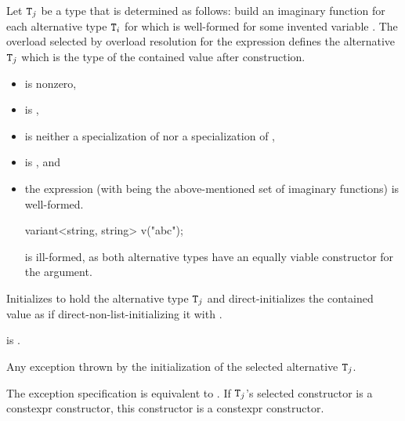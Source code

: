 \begin{itemdescr}
\pnum
Let $\texttt{T}_j$ be a type that is determined as follows:
build an imaginary function 
for each alternative type $\texttt{T}_i$
for which  
is well-formed for some invented variable .
The overload  selected by overload
resolution for the expression  defines
the alternative $\texttt{T}_j$ which is the type of the contained value after
construction.

\pnum
\constraints
\begin{itemize}
\item
{} is nonzero,

\item
{} is ,

\item
{} is neither
a specialization of  nor
a specialization of ,

\item
{} is , and

\item
the expression \brk{}
(with  being the above-mentioned set of
imaginary functions) is well-formed.
\begin{note}
\begin{codeblock}
variant<string, string> v("abc");
\end{codeblock}
is ill-formed, as both alternative types have an equally viable constructor
for the argument.
\end{note}
\end{itemize}

\pnum
\effects
Initializes  to hold the alternative type $\texttt{T}_j$ and
direct-initializes the contained value as if direct-non-list-initializing it
with .

\pnum
\ensures
{} is .

\pnum
\throws
Any exception thrown by the initialization of the selected alternative $\texttt{T}_j$.

\pnum
\remarks
The exception specification is equivalent to
.
If $\texttt{T}_j$'s selected constructor is a constexpr constructor,
this constructor is a constexpr constructor.
\end{itemdescr}

